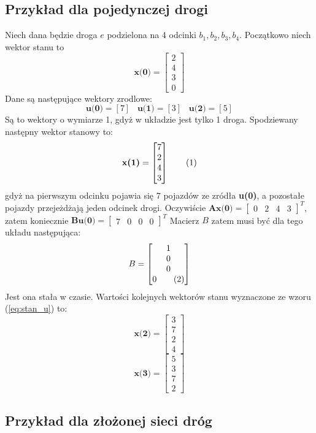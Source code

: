 \documentclass[12pt]{book}
\theoremstyle{plain}
\newcommand\addtag{\refstepcounter{equation}
\renewcommand{\labelenumii}{\theenumii}
\renewcommand{\theenumii}{\theenumi.\arabic{enumii}.}
\tag{\theequation}}
\begin{document}
\subsection{Przykład dla pojedynczej drogi}
Niech dana będzie droga $e$ podzielona na 4 odcinki $b_1,b_2,b_3,b_4$. Początkowo niech wektor stanu to
\[\textbf{x(0)}=\begin{bmatrix} 2 \\ 4 \\ 3 \\ 0 \end{bmatrix} \]
Dane są następujące wektory zrodlowe:
\[\textbf{u(0)}=[7] \;\;\; \textbf{u(1)}=[3] \;\;\; \textbf{u(2)}=[5]\]
Są to wektory o wymiarze 1, gdyż w układzie jest tylko 1 droga.
Spodziewany następny wektor stanowy to:\[\textbf{x(1)}=\begin{bmatrix} 7 \\ 2 \\ 4 \\ 3 \end{bmatrix} \addtag \] gdyż na pierwszym odcinku pojawia się 7 pojazdów ze zródła \textbf{u(0)}, a pozostałe pojazdy przejeżdżają jeden odcinek drogi. Oczywiście $\textbf{Ax(0)}=\begin{bmatrix} 0 & 2 & 4 & 3 \end{bmatrix}^T$, zatem koniecznie
$\textbf{Bu(0)}= \begin{bmatrix} 7 & 0 & 0 & 0 \end{bmatrix}^T$
Macierz $B$ zatem musi być dla tego układu następująca:
\[B=\begin{bmatrix}
1 \\ 0 \\ 0 \\ 0 \addtag
\end{bmatrix}\]
Jest ona stała w czasie. Wartości kolejnych wektorów stanu wyznaczone ze wzoru (\ref{eq:stan_u}) to:
\[\textbf{x(2)}=\begin{bmatrix}
3 \\ 7 \\ 2 \\ 4 
\end{bmatrix}\]
\[\textbf{x(3)}=\begin{bmatrix}
5 \\ 3 \\ 7 \\ 2 
\end{bmatrix}\]
\subsection{Przykład dla złożonej sieci dróg}
\end{document}
